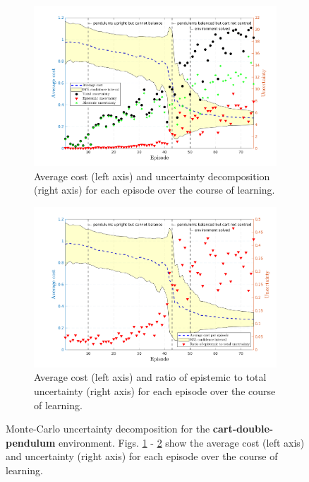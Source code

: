 \begin{figure}[htp!]    
  \begin{subfigure}[b]{1\linewidth}
    \centering
    \includegraphics[height=0.4\textheight,width=1\textwidth]{Chapter3/Figures/cdp_uncertainty.png}
    \caption{Average cost (left axis) and uncertainty decomposition (right axis) for each episode over the course of learning.} 
    \label{Fig:Re-cdp-uncertainty-decomposition} 
  \end{subfigure} 

  \begin{subfigure}[b]{1\linewidth}
    \centering
    \includegraphics[height=0.4\textheight,width=1\textwidth]{Chapter3/Figures/cdp_uncertainty_normalised.png} 
    \caption{Average cost (left axis) and ratio of epistemic to total uncertainty (right axis) for each episode over the course of learning.} 
    \label{Fig:Re-cdp-uncertainty-normalised} 
  \end{subfigure} 
 
\caption[Monte-Carlo roll outs for \textbf{cart-double-pendulum} environment]{Monte-Carlo uncertainty decomposition for the \textbf{cart-double-pendulum} environment. Figs. \ref{Fig:Re-cdp-uncertainty-decomposition} - \ref{Fig:Re-cdp-uncertainty-normalised} show the average cost (left axis) and uncertainty (right axis) for each episode over the course of learning.}
\label{Fig:Re-CartDoublePen-Uncertainties} 
\end{figure}



